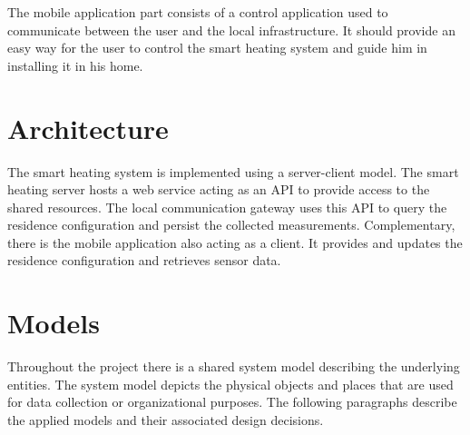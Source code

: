 The mobile application part consists of a control application used to communicate between the user and the local infrastructure. It should provide an easy way for the user to control the smart heating system and guide him in installing it in his home. 

\section{Architecture}

The smart heating system is implemented using a server-client model.
The smart heating server hosts a web service acting as an API to provide access to the shared resources.
The local communication gateway uses this API to query the residence configuration and persist the collected measurements.
Complementary, there is the mobile application also acting as a client.
It provides and updates the residence configuration and retrieves sensor data.




\section{Models}
\label{sec:system_overview_models}

Throughout the project there is a shared system model describing the underlying entities. The system model depicts the physical objects and places that are used for data collection or organizational purposes. The following paragraphs describe the applied models and their associated design decisions.

